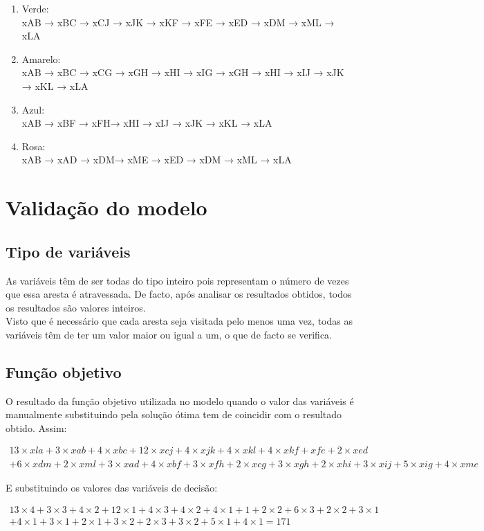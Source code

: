 \documentclass[a4paper]{report}
\begin{document}
\begin{enumerate}
    \item Verde: \\
    xAB → xBC → xCJ → xJK → xKF → xFE → xED → xDM → xML → xLA
    \item Amarelo: \\
    xAB → xBC → xCG → xGH → xHI  → xIG → xGH → xHI → xIJ → xJK  → xKL  → xLA
    \item Azul: \\
    xAB → xBF → xFH→ xHI  → xIJ → xJK  → xKL  → xLA
    \item Rosa: \\
    xAB → xAD → xDM→ xME → xED  → xDM → xML → xLA
\end{enumerate}

\chapter{Validação do modelo}
\section{Tipo de variáveis}
As variáveis têm de ser todas do tipo inteiro pois representam o número
de vezes que essa aresta é atravessada.
De facto, após analisar os resultados obtidos, todos os resultados são
valores inteiros.\\
Visto que é necessário que cada aresta seja visitada pelo menos uma
vez, todas as variáveis têm de ter um valor maior ou igual a um, o
que de facto se verifica.

\section{Função objetivo}
O resultado da função objetivo utilizada no modelo quando o valor
das variáveis é manualmente substituindo pela solução ótima tem de 
coincidir com o resultado obtido.
Assim:

\begin{multline}
13\times xla + 3\times xab + 4\times xbc + 12\times xcj + 4\times
xjk + 4\times xkl + 4\times xkf + xfe + 2\times xed \\ + 6\times xdm +
2\times xml + 3\times xad + 4\times xbf + 3\times xfh + 2\times xcg +
3\times xgh + 2\times xhi + 3\times xij + 5\times xig + 4\times xme
\end{multline}

E substituindo os valores das variáveis de decisão:


\begin{multline}
13\times 4 + 3\times 3 + 4\times 2 + 12\times 1 + 4\times
3 + 4\times 2 + 4\times 1 + 1 + 2\times 2 + 6\times 3 +
2\times 2 + 3\times 1 \\ + 4\times 1 + 3\times 1 + 2\times 1 +
3\times 2 + 2\times 3 + 3\times 2 + 5\times 1 + 4\times 1 
= 171
\end{multline}
\end{document}
